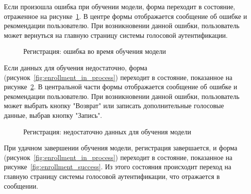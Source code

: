 Если произошла ошибка при обучении модели, форма переходит в состояние, отраженное на рисунке~\ref{fig:enrollment_error_in_learning}. В центре формы отображается сообщение об ошибке и рекомендации пользователю. При возникновении данной ошибки, пользователь может вернуться на главную страницу системы голосовой аутентификации.

\begin{figure}[hbt!]
\caption{Регистрация: ошибка во время обучения модели}
\label{fig:enrollment_error_in_learning}
\end{figure}

Если данных для обучения недостаточно, форма (рисунок~\ref{fig:enrollment_in_process}) переходит в состояние, показанное на рисунке~\ref{fig:enrollment_need_more_data}. В центральной части формы отображается сообщение об ошибке и рекомендации пользователю. При возникновении данной ошибки, пользователь может выбрать кнопку "Возврат" или записать дополнительные голосовые данные, выбрав кнопку "Запись".


\begin{figure}[hbt!]
\caption{Регистрация: недостаточно данных для обучения модели}
\label{fig:enrollment_need_more_data}
\end{figure}

При удачном завершении обучения модели, регистрация завершается, и форма (рисунок~\ref{fig:enrollment_in_process}) переходит в состояние, показанное на рисунке~\ref{fig:enrollment_success}. Из этого состояния происходит переход на главную страницу системы голосовой аутентификации, что отражается в сообщении.   


